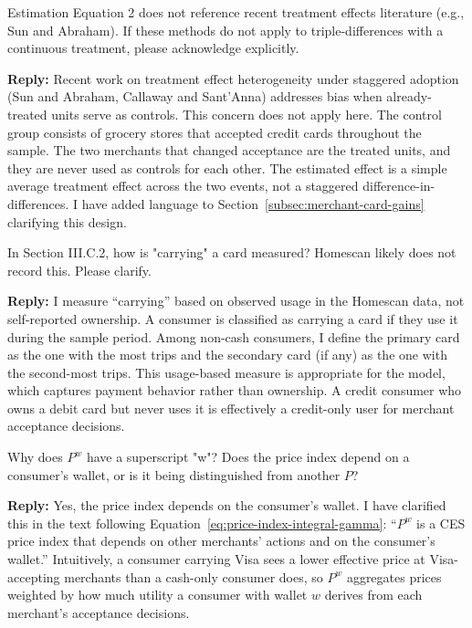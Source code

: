 \documentclass[main.tex]{subfiles}
\begin{document}
\begin{refsection}
\begin{refcommentnoclear}
Estimation Equation 2 does not reference recent treatment effects literature (e.g., Sun and Abraham).
If these methods do not apply to triple-differences with a continuous treatment, please acknowledge explicitly.

\end{refcommentnoclear}

\textbf{Reply:} Recent work on treatment effect heterogeneity under staggered adoption (Sun and Abraham, Callaway and Sant'Anna) addresses bias when already-treated units serve as controls.
This concern does not apply here.
The control group consists of grocery stores that accepted credit cards throughout the sample.
The two merchants that changed acceptance are the treated units, and they are never used as controls for each other.
The estimated effect is a simple average treatment effect across the two events, not a staggered difference-in-differences.
I have added language to Section~\ref{subsec:merchant-card-gains} clarifying this design.

\begin{refcommentnoclear}
In Section III.C.2, how is "carrying" a card measured?
Homescan likely does not record this.
Please clarify.

\end{refcommentnoclear}

\textbf{Reply:} I measure ``carrying'' based on observed usage in the Homescan data, not self-reported ownership.
A consumer is classified as carrying a card if they use it during the sample period.
Among non-cash consumers, I define the primary card as the one with the most trips and the secondary card (if any) as the one with the second-most trips.
This usage-based measure is appropriate for the model, which captures payment behavior rather than ownership.
A credit consumer who owns a debit card but never uses it is effectively a credit-only user for merchant acceptance decisions.

\begin{refcommentnoclear}
Why does $P^w$ have a superscript "w"?
Does the price index depend on a consumer's wallet, or is it being distinguished from another $P$?

\end{refcommentnoclear}

\textbf{Reply:} Yes, the price index depends on the consumer's wallet.
I have clarified this in the text following Equation~\ref{eq:price-index-integral-gamma}: ``$P^w$ is a CES price index that depends on other merchants' actions and on the consumer's wallet.'' Intuitively, a consumer carrying Visa sees a lower effective price at Visa-accepting merchants than a cash-only consumer does, so $P^w$ aggregates prices weighted by how much utility a consumer with wallet $w$ derives from each merchant's acceptance decisions.


\end{refsection}
\end{document}
